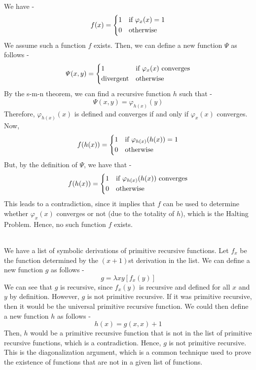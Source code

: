 \documentclass[openany]{book}
\begin{document}
\begin{exercise}\\
    We have - 
    $$f(x) = \begin{dcases}
        1 & \text{if } \varphi_x(x) = 1 \\
        0 & \text{otherwise}
    \end{dcases}$$
    We assume such a function $f$ exists. Then, we can define a new function $\varPsi$ as follows -
    $$\varPsi(x, y) = \begin{dcases}
        1 & \text{if } \varphi_x(x) \text{ converges} \\
        \text{divergent} & \text{otherwise}
    \end{dcases}$$
    By the s-m-n theorem, we can find a recursive function $h$ such that -
    $$\varPsi(x, y) = \varphi_{h(x)}(y)$$
    Therefore, $\varphi_{h(x)}(x)$ is defined and converges if and only if $\varphi_x(x)$ converges.
    Now, 
    $$f(h(x)) = \begin{dcases}
        1 & \text{if } \varphi_{h(x)}(h(x)) = 1\\
        0 & \text{otherwise}
    \end{dcases}$$
    But, by the definition of $\varPsi$, we have that - 
    $$f(h(x)) = \begin{dcases}
        1 & \text{if } \varphi_{h(x)}(h(x)) \text{ converges} \\
        0 & \text{otherwise}
    \end{dcases}$$
    This leads to a contradiction, since it implies that $f$ can be used to determine whether $\varphi_x(x)$ converges or not (due to the totality of $h$), which is the Halting Problem. Hence, no such function $f$ exists.
\end{exercise}
\begin{exercise}\\
    We have a list of symbolic derivations of primitive recursive functions. Let $f_x$ be the function determined by the $(x+1)$st derivation in the list. We can define a new function $g$ as follows -
    $$g = \lambda xy[f_x (y)]$$
    We can see that $g$ is recursive, since $f_x(y)$ is recursive and defined for all $x$ and $y$ by definition. However, $g$ is not primitive recursive. If it was primitive recursive, then it would be the universal primitive recursive function. We could then define a new function $h$ as follows -
    $$h(x) = g(x, x) + 1$$
    Then, $h$ would be a primitive recursive function that is not in the list of primitive recursive functions, which is a contradiction. Hence, $g$ is not primitive recursive. This is the diagonalization argument, which is a common technique used to prove the existence of functions that are not in a given list of functions.
\end{exercise}
\end{document}
